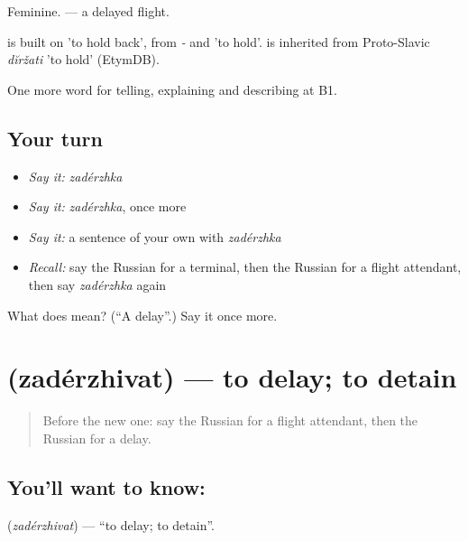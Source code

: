 Feminine. \emph{  } — a delayed flight.

\begin{cousinweb}
\emph{} is built on \emph{} 'to hold back', from \emph{-} and \emph{} 'to hold'. \emph{} is inherited from Proto-Slavic \emph{dĭržati} 'to hold' (EtymDB).
\end{cousinweb}

\begin{grammarlens}[title={What you've built}]
One more word for telling, explaining and describing at B1.
\end{grammarlens}

\subsection*{Your turn}
\begin{itemize}
\raggedright
  \item \emph{Say it:} \emph{zadérzhka}
  \item \emph{Say it:} \emph{zadérzhka}, once more
  \item \emph{Say it:} a sentence of your own with \emph{zadérzhka}
  \item \emph{Recall:} say the Russian for a terminal, then the Russian for a flight attendant, then say \emph{zadérzhka} again
\end{itemize}

\begin{tcolorbox}[breakable,colback=teal!4,colframe=teal!35!black,title={Before you move on}]
What does  mean? (\textquotedblleft{}A delay\textquotedblright{}.) Say it once more.
\end{tcolorbox}
\section[\texorpdfstring{\ru{задерживать} (zadérzhivat)}{задерживать (zadérzhivat)}]{ (zadérzhivat) — to delay; to detain}

\label{lesson:RU-C423-zaderzhivat}



\begin{quote}
Before the new one: say the Russian for a flight attendant, then the Russian for a delay.
\end{quote}

\subsection*{You'll want to know: }
\textbf{} (\emph{zadérzhivat}) — \textquotedblleft{}to delay; to detain\textquotedblright{}.

